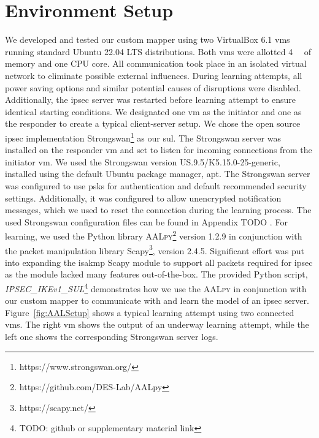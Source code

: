 \section{Environment Setup} \label{sec:learnenv}
We developed and tested our custom mapper using two VirtualBox 6.1 \acp{vm} running standard Ubuntu 22.04 LTS distributions. Both \acp{vm} were allotted \SI{4}{\giga\byte} of memory and one CPU core. All communication took place in an isolated virtual network to eliminate possible external influences. During learning attempts, all power saving options and similar potential causes of disruptions were disabled. Additionally, the \ac{ipsec} server was restarted before learning attempt to ensure identical starting conditions. We designated one \ac{vm} as the initiator and one as the responder to create a typical client-server setup. We chose the open source \ac{ipsec} implementation Strongswan\footnote{https://www.strongswan.org/} as our \ac{sul}. The Strongswan server was installed on the responder \ac{vm} and set to listen for incoming connections from the initiator \ac{vm}. We used the Strongswan version US.9.5/K5.15.0-25-generic, installed using the default Ubuntu package manager, apt. The Strongswan server was configured to use \acp{psk} for authentication and default recommended security settings. Additionally, it was configured to allow unencrypted notification messages, which we used to reset the connection during the learning process. The used Strongswan configuration files can be found in Appendix TODO . For learning, we used the Python library \textsc{AALpy}\footnote{https://github.com/DES-Lab/AALpy} version 1.2.9 in conjunction with the packet manipulation library Scapy\footnote{https://scapy.net/}, version 2.4.5. Significant effort was put into expanding the \ac{isakmp} Scapy module to support all packets required for \ac{ipsec} as the module lacked many features out-of-the-box. The provided Python script, \emph{IPSEC\_IKEv1\_SUL}\footnote{TODO: github or supplementary material link} demonstrates how we use the \textsc{AALpy} in conjunction with our custom mapper to communicate with and learn the model of an \ac{ipsec} server. Figure~\ref{fig:AALSetup} shows a typical learning attempt using two connected \acp{vm}. The right \ac{vm} shows the output of an underway learning attempt, while the left one shows the corresponding Strongswan server logs.

